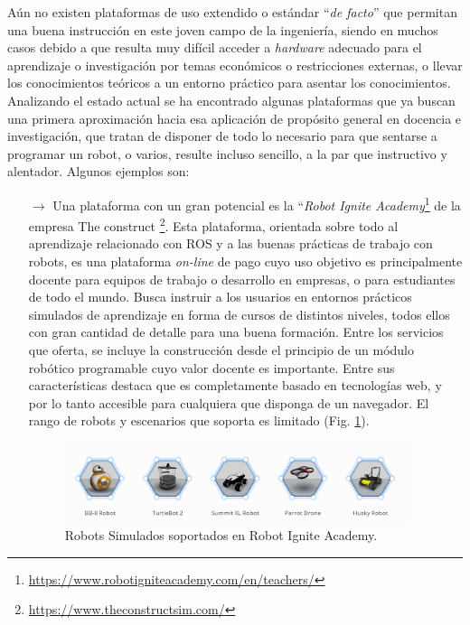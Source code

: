 Aún no existen plataformas de uso extendido o estándar ``\textit{de facto}'' que permitan una buena instrucción en este joven campo de la ingeniería, siendo en muchos casos debido a que resulta muy difícil acceder a \textit{hardware} adecuado para el aprendizaje o investigación por temas económicos o restricciones externas, o llevar los conocimientos teóricos a un entorno práctico para asentar los conocimientos. Analizando el estado actual se ha encontrado algunas plataformas que ya buscan una primera aproximación hacia esa aplicación de propósito general en docencia e investigación, que tratan de disponer de todo lo necesario para que sentarse a programar un robot, o varios, resulte incluso sencillo, a la par que instructivo y alentador. Algunos ejemplos son:

\begin{itemize}
\item [$\rightarrow$]Una plataforma con un gran potencial es la ``\textit{Robot Ignite Academy}\footnote{\url{https://www.robotigniteacademy.com/en/teachers/}} de la empresa The construct \footnote{\url{https://www.theconstructsim.com/}}. Esta plataforma, orientada sobre todo al aprendizaje relacionado con ROS y a las buenas prácticas de trabajo con robots, es una plataforma \textit{on-line} de pago cuyo uso objetivo es principalmente docente para equipos de trabajo o desarrollo en empresas, o para estudiantes de todo el mundo. Busca instruir a los usuarios en entornos prácticos simulados de aprendizaje en forma de cursos de distintos niveles, todos ellos con gran cantidad de detalle para una buena formación. Entre los servicios que oferta, se incluye la construcción desde el principio de un módulo robótico programable cuyo valor docente es importante. Entre sus características destaca que es completamente basado en tecnologías web, y por lo tanto accesible para cualquiera que disponga de un navegador. El rango de robots y escenarios que soporta es limitado (Fig. \ref{theconstruct}).
\begin{figure}[!hbtp]  \centering\noindent
    \includegraphics[width=0.95\textwidth]{figures/theconstruct.png}
    \caption{Robots Simulados soportados en Robot Ignite Academy.}
    \label{theconstruct}
\end{figure}

\end{itemize}
